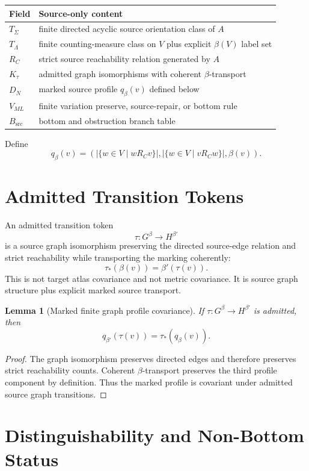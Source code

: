 \documentclass[11pt]{article}
\newtheorem{lemma}{Lemma}
\begin{document}
\begin{longtable}{p{}p{}}
\toprule
Field & Source-only content \\
\midrule
\(T_\Sigma\) & finite directed acyclic source orientation class of \(A\) \\
\(T_\Lambda\) & finite counting-measure class on \(V\) plus explicit \(\beta(V)\) label set \\
\(R_C\) & strict source reachability relation generated by \(A\) \\
\(K_\tau\) & admitted graph isomorphisms with coherent \(\beta\)-transport \\
\(D_N\) & marked source profile \(q_\beta(v)\) defined below \\
\(V_{ML}\) & finite variation preserve, source-repair, or bottom rule \\
\(B_{\mathrm{src}}\) & bottom and obstruction branch table \\
\bottomrule
\end{longtable}

Define
\[
q_\beta(v)=
\left(
|\{w\in V\mid wR_C v\}|,
|\{w\in V\mid vR_C w\}|,
\beta(v)
\right).
\]

\section{Admitted Transition Tokens}

An admitted transition token
\[
  \tau:G^\beta\to H^{\beta'}
\]
is a source graph isomorphism preserving the directed source-edge relation and
strict reachability while transporting the marking coherently:
\[
  \tau_\ast(\beta(v))=\beta'(\tau(v)).
\]
This is not target atlas covariance and not metric covariance. It is source
graph structure plus explicit marked source transport.

\begin{lemma}[Marked finite graph profile covariance]
If \(\tau:G^\beta\to H^{\beta'}\) is admitted, then
\[
  q_{\beta'}(\tau(v))=\tau_\ast(q_\beta(v)).
\]
\end{lemma}

\begin{proof}
The graph isomorphism preserves directed edges and therefore preserves strict
reachability counts. Coherent \(\beta\)-transport preserves the third profile
component by definition. Thus the marked profile is covariant under admitted
source graph transitions.
\end{proof}

\section{Distinguishability and Non-Bottom Status}
\end{document}
